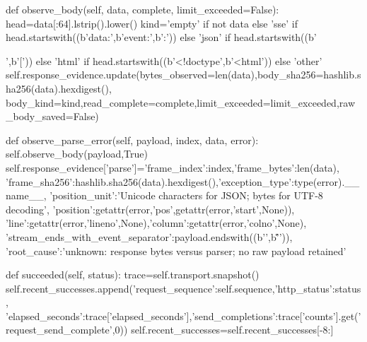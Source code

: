    def observe_body(self, data, complete, limit_exceeded=False):
        head=data[:64].lstrip().lower()
        kind='empty' if not data else 'sse' if head.startswith((b'data:',b'event:',b':')) else 'json' if head.startswith((b'{',b'[')) else 'html' if head.startswith((b'<!doctype',b'<html')) else 'other'
        self.response_evidence.update(bytes_observed=len(data),body_sha256=hashlib.sha256(data).hexdigest(),
            body_kind=kind,read_complete=complete,limit_exceeded=limit_exceeded,raw_body_saved=False)

    def observe_parse_error(self, payload, index, data, error):
        self.observe_body(payload,True)
        self.response_evidence['parse']={'frame_index':index,'frame_bytes':len(data),
            'frame_sha256':hashlib.sha256(data).hexdigest(),'exception_type':type(error).__name__,
            'position_unit':'Unicode characters for JSON; bytes for UTF-8 decoding',
            'position':getattr(error,'pos',getattr(error,'start',None)),
            'line':getattr(error,'lineno',None),'column':getattr(error,'colno',None),
            'stream_ends_with_event_separator':payload.endswith((b'\n\n',b'\r\n\r\n')),
            'root_cause':'unknown: response bytes versus parser; no raw payload retained'}

    def succeeded(self, status):
        trace=self.transport.snapshot()
        self.recent_successes.append({'request_sequence':self.sequence,'http_status':status,
            'elapsed_seconds':trace['elapsed_seconds'],'send_completions':trace['counts'].get('request_send_complete',0)})
        self.recent_successes=self.recent_successes[-8:]

}
